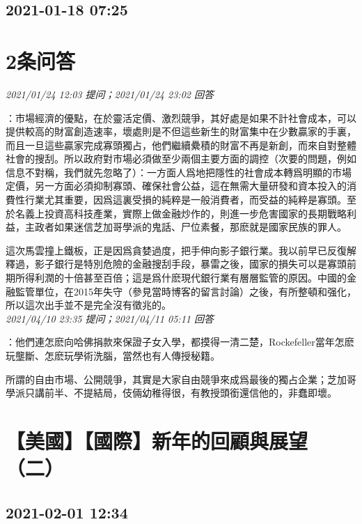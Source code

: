 \documentclass[twocolumn]{ctexart}
\begin{document}
\subsection{2021-01-18 07:25}


\section{2条问答}

\textit{\hfill\noindent\small 2021/01/24 12:03 提问；2021/01/24 23:02 回答}

：市場經濟的優點，在於靈活定價、激烈競爭，其好處是如果不計社會成本，可以提供較高的財富創造速率，壞處則是不但這些新生的財富集中在少數贏家的手裏，而且一旦這些贏家完成寡頭獨占，他們繼續纍積的財富不再是新創，而來自對整體社會的搜刮。所以政府對市場必須做至少兩個主要方面的調控（次要的問題，例如信息不對稱，我們就先忽略了）：一方面人爲地把隱性的社會成本轉爲明顯的市場定價，另一方面必須抑制寡頭、確保社會公益，這在無需大量研發和資本投入的消費性行業尤其重要，因爲這裏受損的純粹是一般消費者，而受益的純粹是寡頭。至於名義上投資高科技產業，實際上做金融炒作的，則進一步危害國家的長期戰略利益，主政者如果迷信芝加哥學派的鬼話、尸位素餐，那麽就是國家民族的罪人。

這次馬雲撞上鐵板，正是因爲貪婪過度，把手伸向影子銀行業。我以前早已反復解釋過，影子銀行是特別危險的金融搜刮手段，暴雷之後，國家的損失可以是寡頭前期所得利潤的十倍甚至百倍；這是爲什麽現代銀行業有層層監管的原因。中國的金融監管單位，在2015年失守（參見當時博客的留言討論）之後，有所整頓和强化，所以這次出手並不是完全沒有徵兆的。
\\

\textit{\hfill\noindent\small 2021/04/10 23:35 提问；2021/04/11 05:11 回答}

：他們連怎麽向哈佛捐款來保證子女入學，都摸得一清二楚，Rockefeller當年怎麽玩壟斷、怎麽玩學術洗腦，當然也有人傳授秘籍。

所謂的自由市場、公開競爭，其實是大家自由競爭來成爲最後的獨占企業；芝加哥學派只講前半、不提結局，伎倆幼稚得很，有教授頭銜還信他的，非蠢即壞。
\\


\section{【美國】【國際】新年的回顧與展望（二）}
\subsection{2021-02-01 12:34}
\end{document}
